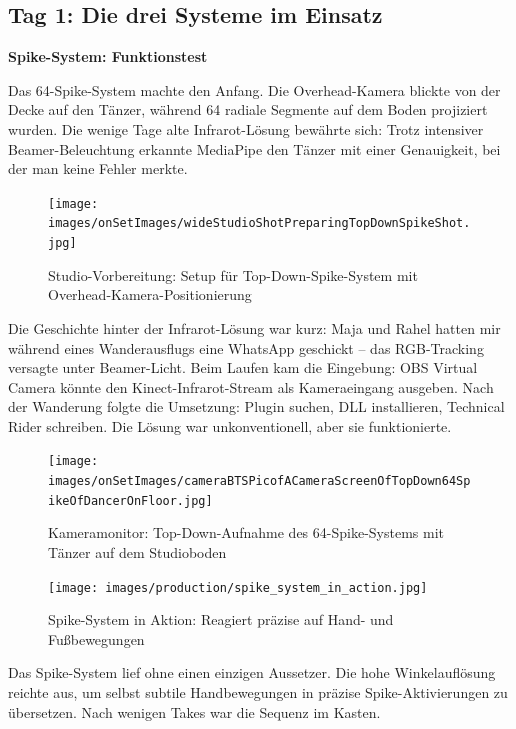 \newpage

\subsection{Tag 1: Die drei Systeme im Einsatz}

\textbf{Spike-System: Funktionstest}

Das 64-Spike-System machte den Anfang. Die Overhead-Kamera blickte von der Decke auf den Tänzer, während 64 radiale Segmente auf dem Boden projiziert wurden. Die wenige Tage alte Infrarot-Lösung bewährte sich: Trotz intensiver Beamer-Beleuchtung erkannte MediaPipe den Tänzer mit einer Genauigkeit, bei der man keine Fehler merkte.

\begin{figure}[h]
   \centering
   \texttt{[image: images/onSetImages/wideStudioShotPreparingTopDownSpikeShot.jpg]}
   \caption{Studio-Vorbereitung: Setup für Top-Down-Spike-System mit Overhead-Kamera-Positionierung}
   \label{fig:topdown_setup}
\end{figure}

Die Geschichte hinter der Infrarot-Lösung war kurz: Maja und Rahel hatten mir während eines Wanderausflugs eine WhatsApp geschickt – das RGB-Tracking versagte unter Beamer-Licht. Beim Laufen kam die Eingebung: OBS Virtual Camera könnte den Kinect-Infrarot-Stream als Kameraeingang ausgeben. Nach der Wanderung folgte die Umsetzung: Plugin suchen, DLL installieren, Technical Rider schreiben. Die Lösung war unkonventionell, aber sie funktionierte.

\begin{figure}[h]
   \centering
   \texttt{[image: images/onSetImages/cameraBTSPicofACameraScreenOfTopDown64SpikeOfDancerOnFloor.jpg]}
   \caption{Kameramonitor: Top-Down-Aufnahme des 64-Spike-Systems mit Tänzer auf dem Studioboden}
   \label{fig:camera_monitor}
\end{figure}

\begin{figure}[h]
   \centering
   \texttt{[image: images/production/spike\_system\_in\_action.jpg]}
   \caption{Spike-System in Aktion: Reagiert präzise auf Hand- und Fußbewegungen}
   \label{fig:spike_action}
\end{figure}

Das Spike-System lief ohne einen einzigen Aussetzer. Die hohe Winkelauflösung reichte aus, um selbst subtile Handbewegungen in präzise Spike-Aktivierungen zu übersetzen. Nach wenigen Takes war die Sequenz im Kasten.

